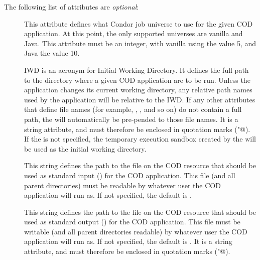 
The following list of attributes are \emph{optional}:

\begin{description}

 \item[] This attribute defines what Condor job
   universe to use for the given COD application.
   At this point, the only supported universes are vanilla and Java.
   This attribute must be an integer, with vanilla using the value 5,
   and Java the value 10.

 \item[] IWD is an acronym for Initial Working Directory.
   It defines the full path to the directory where a given COD
   application are to be run.
   Unless the application changes its current working directory, any
   relative path names used by the application will be relative to
   the IWD.
   If any other attributes that define file names (for example,
   , , and so on) do not contain a full path, the
    will automatically be pre-pended to those file names.
   It is a string attribute, and must therefore be enclosed in 
   quotation marks (\verb@"@).
   If the  is not specified, the temporary execution sandbox
   created by the  will be used as the initial working
   directory.

 \item[] This string defines the path to the file on the
   COD resource that should be used as standard input () for 
   the COD application.
   This file (and all parent directories) must be readable by whatever
   user the COD application will run as.
   If not specified, the default is .
 
 \item[] This string defines the path to the file on the
   COD resource that should be used as standard output ()
   for the COD application.
   This file must be writable (and all parent directories readable) by
   whatever user the COD application will run as.
   If not specified, the default is .
   It is a string attribute, and must therefore be enclosed in 
   quotation marks (\verb@"@).
 

\end{description}
